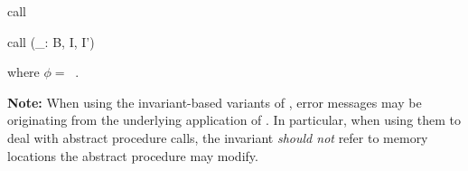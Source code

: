 \begin{tactic}{call}
\begin{tsyntax}{call (_: B, I, I')}
  \begin{center}
  \end{center}
  
  \noindent where $\phi =\ $ .
  \end{tsyntax}

  \textbf{Note:} When using the invariant-based variants of
  , error messages may be originating from the underlying
  application of . In particular, when using them to
  deal with abstract procedure calls, the invariant \emph{should not}
  refer to memory locations the abstract procedure may modify.
\end{tactic}
